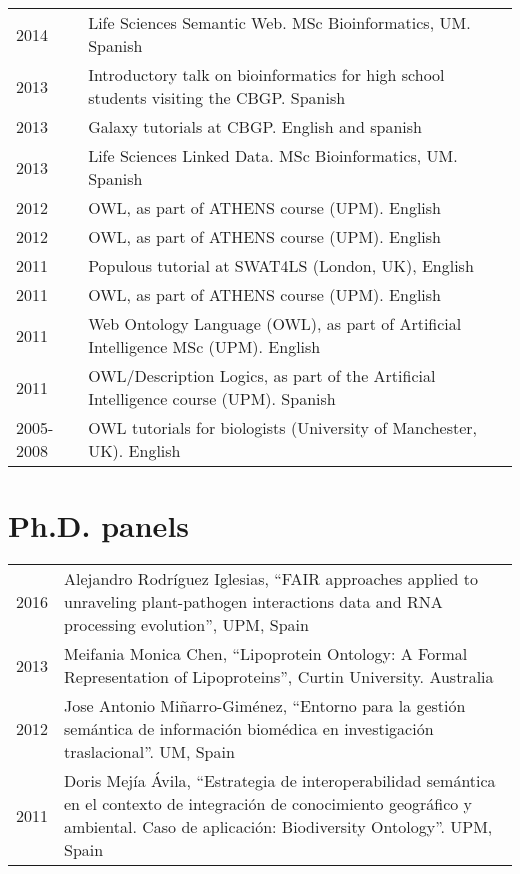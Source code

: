 \documentclass[11pt,fullpage]{article}
\begin{document}
\begin{longtable}{p{0.5in}|p{5.5in}}
2014 & Life Sciences Semantic Web. MSc Bioinformatics, UM. Spanish \\ %
2013 & Introductory talk on bioinformatics for high school students visiting the CBGP. Spanish \\
2013 & Galaxy tutorials at CBGP. English and spanish \\ %
2013 & Life Sciences Linked Data. MSc Bioinformatics, UM. Spanish \\
2012 & OWL, as part of ATHENS course (UPM). English \\
2012 & OWL, as part of ATHENS course (UPM). English \\
2011 & Populous tutorial at SWAT4LS (London, UK), English \\
2011 & OWL, as part of ATHENS course (UPM). English \\
2011 & Web Ontology Language (OWL), as part of Artificial Intelligence MSc (UPM). English \\ %
2011 & OWL/Description Logics, as part of the Artificial Intelligence course (UPM). Spanish \\ %
2005-2008 & OWL tutorials for biologists (University of Manchester, UK). English \\

\end{longtable}


\section*{Ph.D. panels}

\begin{longtable}{p{0.5in}|p{5.5in}}

2016 & Alejandro Rodr\'iguez Iglesias, ``FAIR approaches applied to unraveling plant-pathogen interactions data and RNA processing evolution'', UPM, Spain \\

2013 & Meifania Monica Chen, ``Lipoprotein Ontology: A Formal Representation of Lipoproteins'', Curtin University. Australia \\

2012 & Jose Antonio Mi\~narro-Gim\'enez, ``Entorno para la gesti\'on sem\'antica de informaci\'on biom\'edica en investigaci\'on traslacional''. UM, Spain \\

2011 & Doris Mej\'ia \'Avila, ``Estrategia de interoperabilidad sem\'antica en el contexto de integraci\'on de conocimiento geogr\'afico y ambiental. Caso de aplicaci\'on: Biodiversity Ontology''. UPM, Spain \\

\end{longtable}
\end{document}
